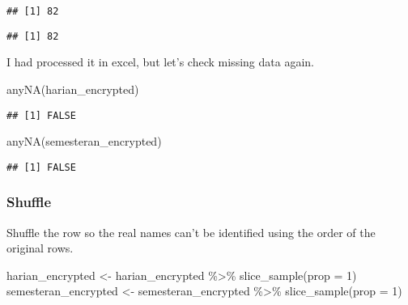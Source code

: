 \documentclass[
]{article}
\newenvironment{Shaded}{\begin{snugshade}}{\end{snugshade}}
\newcommand{\AttributeTok}[1]{\textcolor[rgb]{0.77,0.63,0.00}{#1}}
\newcommand{\DecValTok}[1]{\textcolor[rgb]{0.00,0.00,0.81}{#1}}
\newcommand{\FunctionTok}[1]{\textcolor[rgb]{0.00,0.00,0.00}{#1}}
\newcommand{\NormalTok}[1]{#1}
\newcommand{\OtherTok}[1]{\textcolor[rgb]{0.56,0.35,0.01}{#1}}
\newcommand{\SpecialCharTok}[1]{\textcolor[rgb]{0.00,0.00,0.00}{#1}}
\begin{document}
\begin{Shaded}
\end{Shaded}

\begin{verbatim}
## [1] 82
\end{verbatim}

\begin{Shaded}
\end{Shaded}

\begin{verbatim}
## [1] 82
\end{verbatim}

I had processed it in excel, but let's check missing data again.

\begin{Shaded}
\begin{Highlighting}[]
\FunctionTok{anyNA}\NormalTok{(harian\_encrypted)}
\end{Highlighting}
\end{Shaded}

\begin{verbatim}
## [1] FALSE
\end{verbatim}

\begin{Shaded}
\begin{Highlighting}[]
\FunctionTok{anyNA}\NormalTok{(semesteran\_encrypted)}
\end{Highlighting}
\end{Shaded}

\begin{verbatim}
## [1] FALSE
\end{verbatim}

\hypertarget{shuffle}{%
\subsubsection{Shuffle}\label{shuffle}}

Shuffle the row so the real names can't be identified using the order of
the original rows.

\begin{Shaded}
\begin{Highlighting}[]
\NormalTok{harian\_encrypted }\OtherTok{\textless{}{-}}\NormalTok{ harian\_encrypted }\SpecialCharTok{\%\textgreater{}\%} \FunctionTok{slice\_sample}\NormalTok{(}\AttributeTok{prop =} \DecValTok{1}\NormalTok{)}
\NormalTok{semesteran\_encrypted }\OtherTok{\textless{}{-}}\NormalTok{ semesteran\_encrypted }\SpecialCharTok{\%\textgreater{}\%} \FunctionTok{slice\_sample}\NormalTok{(}\AttributeTok{prop =} \DecValTok{1}\NormalTok{)}
\end{Highlighting}
\end{Shaded}
\end{document}
